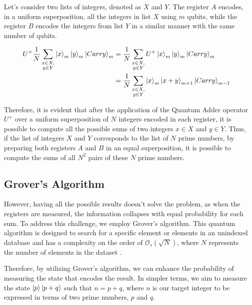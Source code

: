 \documentclass[aps,prapplied,longbibliography]{article}
\begin{document}
    Let's consider two lists of integers, denoted as $X$ and $Y$. The register $A$ encodes, in a uniform superposition, all the integers in list $X$ using $m$ qubits, while the register $B$ encodes the integers from list $Y$ in a similar manner with the same number of qubits.

    \begin{equation}
        \begin{aligned}
            U^+ \frac 1N\sum_{\substack {x\in X,\\y\in Y}} \ket{x}_m  \ket{y}_m  \ket{Carry}_m &= \frac 1N \sum_{\substack {x\in X,\\y\in Y}} U^+ \ket{x}_m\ket{y}_m\ket{Carry}_m\\
            &= \frac 1N \sum_{\substack {x\in X,\\y\in Y}} \ket{x}_m\ket{x+y}_{m+1}\ket{Carry}_{m-1}
        \end{aligned}
    \end{equation}

    Therefore, it is evident that after the application of the Quantum Adder operator $U^+$ over a uniform superposition of $N$ integers encoded in each register, it is possible to compute all the possible sums of two integers $x\in X$ and $y \in Y$. Thus, if the list of integers $X$ and $Y$ corresponds to the list of $N$ prime numbers, by preparing both registers $A$ and $B$ in an equal superposition, it is possible to compute the sums of all $N^2$ pairs of these $N$ prime numbers.

    \subsection{Grover's Algorithm}

    However, having all the possible results doesn't solve the problem, as when the registers are measured, the information collapses with equal probability for each sum. To address this challenge, we employ Grover's algorithm. This quantum algorithm is designed to search for a specific element or elements in an unindexed database and has a complexity on the order of $\mathcal{O}_s(\sqrt{N})$, where $N$ represents the number of elements in the dataset \cite{grover1996fast}.

    Therefore, by utilizing Grover's algorithm, we can enhance the probability of measuring the state that encodes the result. In simpler terms, we aim to measure the state $\ket{p}\ket{p+q}$ such that $n = p+q$, where $n$ is our target integer to be expressed in terms of two prime numbers, $p$ and $q$.
\end{document}
